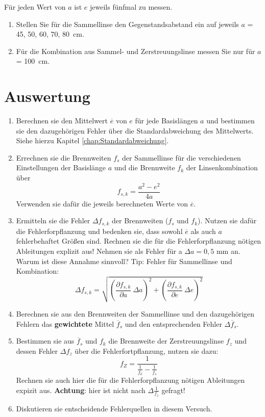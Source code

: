 Für jeden Wert von $a$ ist $e$ jeweils fünfmal zu messen.

\begin{enumerate}
 \item Stellen Sie für die Sammellinse den Gegenstandsabstand ein auf jeweils $a$ = 45, 50, 60, 70, 80~cm.
 \item Für die Kombination aus Sammel- und Zerstreuungslinse messen Sie nur für $a$ = 100~cm.
\end{enumerate}

\section{Auswertung} 

\begin{enumerate}
%
\item Berechnen sie den Mittelwert $\overline{e}$ von $e$ für jede Basislängen $a$ und bestimmen sie den dazugehörigen Fehler über die Standardabweichung des Mittelwerts. Siehe hierzu Kapitel \ref{chap:Standardabweichung}.
%
\item Errechnen sie die Brennweiten $f_s$ der Sammellinse für die verschiedenen Einstellungen der Basislänge $a$ und die Brennweite $f_k$ der Linsenkombination über 
\begin{equation*}
f_{s,k} = \frac{a^2-e^2}{4 a}
\end{equation*}
Verwenden sie dafür die jeweils berechneten Werte von $\overline{e}$.
%
\item Ermitteln sie die Fehler $\Delta f_{s,k}$ der Brennweiten ($f_s$ und $f_k$). Nutzen sie dafür die Fehlerforpflanzung und bedenken sie, dass sowohl $\overline{e}$ als auch $a$ fehlerbehaftet Größen sind. Rechnen sie die für die Fehlerforpflanzung nötigen Ableitungen explizit aus! Nehmen sie als Fehler für a $\Delta a = 0,5$ mm an. Warum ist diese Annahme sinnvoll?
Tip: Fehler für Sammellinse und Kombination:
\begin{equation*}\Delta f_{s,k}=\sqrt{\left(\frac{\partial f_{s,k}}{\partial a} ~ \Delta a\right)^2 + \left(\frac{\partial f_{s,k}}{\partial e} ~ \Delta e\right)^2}
\end{equation*}
%
\item Berechnen sie aus den Brennweiten der Sammellinse und den dazugehörigen Fehlern das \textbf{gewichtete} Mittel $\overline{f}_s$ und den entsprechenden Fehler $\Delta \overline{f}_s$.
%
\item Bestimmen sie aus $\overline{f}_s$ und $f_k$ die Brennweite der Zerstreuungslinse $f_z$ und dessen Fehler $\Delta f_z$ über die Fehlerfortpflanzung, nutzen sie dazu:
\begin{equation*}
f_Z = \frac{1}{\frac{1}{f_k} - \frac{1}{f_s}}
\end{equation*}
Rechnen sie auch hier die für die Fehlerforpflanzung nötigen Ableitungen expizit aus.
\textbf{Achtung}: hier ist nicht nach $\Delta \frac{1}{f_z}$ gefragt!
%
\item Diskutieren sie entscheidende Fehlerquellen in diesem Versuch.
%
\end{enumerate}